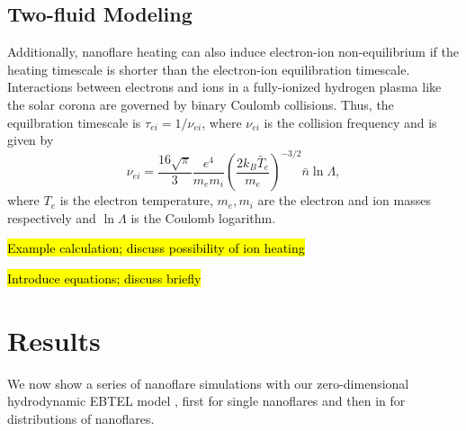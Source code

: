 \documentclass[apj]{emulateapj}
\begin{document}
	\subsection{Two-fluid Modeling}
	\label{subsec:two_fluid_theory}
	\par Additionally, nanoflare heating can also induce electron-ion non-equilibrium if the heating timescale is shorter than the electron-ion equilibration timescale. Interactions between electrons and ions in a fully-ionized hydrogen plasma like the solar corona are governed by binary Coulomb collisions. Thus, the equilbration timescale is $\tau_{ei}=1/\nu_{ei}$, where $\nu_{ei}$ is the collision frequency and is given by
	\begin{equation}
		\nu_{ei} = \frac{16\sqrt{\pi}}{3}\frac{e^4}{m_em_i}\left(\frac{2k_B\bar{T}_e}{m_e}\right)^{-3/2}\bar{n}\ln{\Lambda},
	\end{equation}
	where $T_e$ is the electron temperature, $m_e,m_i$ are the electron and ion masses respectively and $\ln{\Lambda}$ is the Coulomb logarithm.
	\par\hl{Example calculation; discuss possibility of ion heating}
	\par\hl{Introduce equations; discuss briefly}
	\section{Results}
	\label{sec:results}
	\par We now show a series of nanoflare simulations with our zero-dimensional hydrodynamic EBTEL model \citep{klimchuk_highly_2008, cargill_enthalpy-based_2012, cargill_enthalpy-based_2012-1, cargill_modelling_2015}, first for single nanoflares and then in  for distributions of nanoflares. 
\end{document}
